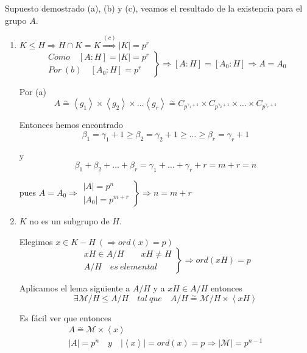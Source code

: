 \documentclass{article}
\begin{document}
Supuesto demostrado (a), (b) y (c), veamos el resultado de la existencia para el grupo $A$.

\begin{enumerate}[\bfseries C{a}so 1:]
\item $K\leq H\Rightarrow H\cap K=K\overset{(c)}{\Rightarrow}|K|=p^r$
\begin{equation*}
\left.\begin{array}{c}
Como \quad \left[A:H\right]=|K|=p^r\\
Por\:(b)\quad \left[A_0:H\right]=p^r
\end{array}\right\rbrace \Rightarrow \left[A:H\right]=\left[A_0:H\right]\Rightarrow A=A_0
\end{equation*}

Por (a)
\begin{equation*}
A\overset{\sim}{=}\left\langle g_1\right\rangle\times \left\langle g_2\right\rangle \times \ldots \left\langle g_r\right\rangle \overset{\sim}{=}C_{p^{\gamma_1+1}}\times C_{p^{\gamma_2+1}}\times \ldots \times C_{p^{\gamma_r+1}}
\end{equation*}

Entonces hemos encontrado
\begin{equation*}
\beta_1=\gamma_1+1\geq \beta_2=\gamma_2+1\geq \ldots\geq \beta_r=\gamma_r+1
\end{equation*}

y
\begin{equation*}
\beta_1+\beta_2+\ldots+\beta_r=\gamma_1+\ldots+\gamma_r+r=m+r=n
\end{equation*}

pues $A=A_0\Rightarrow \left.\begin{array}{c}
|A|=p^n\\
|A_0|=p^{m+r}
\end{array}\right\rbrace \Rightarrow n=m+r$

\item $K$ no es un subgrupo de $H$.

Elegimos $x\in K-H\:(\Rightarrow ord(x)=p)$
\begin{equation*}
\left.\begin{array}{c}
xH\in A/H\qquad xH\neq H\\
A/H\quad es\:elemental
\end{array}\right\rbrace \Rightarrow ord(xH)=p
\end{equation*}

Aplicamos el lema siguiente a $A/H$ y a $xH\in A/H$ entonces 
\begin{equation*}
\exists \mathcal{M}/H\leq A/H\quad tal\:que\quad A/H\overset{\sim}{=}\mathcal{M}/H\times \left\langle xH\right\rangle
\end{equation*}

Es fácil ver que entonces
\begin{gather*}
A\overset{\sim}{=}\mathcal{M}\times \left\langle x\right\rangle \\
|A|=p^n\quad y\quad |\left\langle x\right\rangle|=ord(x)=p\Rightarrow |\mathcal{M}|=p^{n-1}
\end{gather*}
\end{enumerate}
\end{document}
